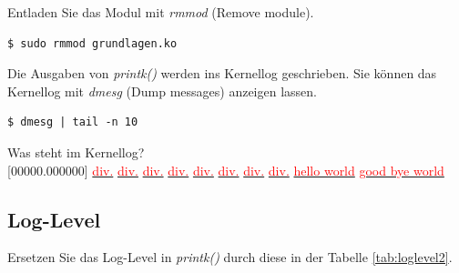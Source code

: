 Entladen Sie das Modul mit \emph{rmmod} (Remove module).
\begin{lstlisting}
$ sudo rmmod grundlagen.ko
\end{lstlisting}

Die Ausgaben von \emph{printk()} werden ins Kernellog geschrieben. Sie können das Kernellog mit \emph{dmesg} (Dump messages) anzeigen lassen.
\begin{lstlisting}
$ dmesg | tail -n 10
\end{lstlisting} \hfill

Was steht im Kernellog? \\

[00000.000000] \underline{\textcolor{red}{div.}\hspace{0.5\textwidth}} \newline
[00000.000000] \underline{\textcolor{red}{div.}\hspace{0.5\textwidth}} \newline
[00000.000000] \underline{\textcolor{red}{div.}\hspace{0.5\textwidth}} \newline
[00000.000000] \underline{\textcolor{red}{div.}\hspace{0.5\textwidth}} \newline
[00000.000000] \underline{\textcolor{red}{div.}\hspace{0.5\textwidth}} \newline
[00000.000000] \underline{\textcolor{red}{div.}\hspace{0.5\textwidth}} \newline
[00000.000000] \underline{\textcolor{red}{div.}\hspace{0.5\textwidth}} \newline
[00000.000000] \underline{\textcolor{red}{div.}\hspace{0.5\textwidth}} \newline
[00000.000000] \underline{\textcolor{red}{hello world}\hspace{0.415\textwidth}} \newline
[00000.000000] \underline{\textcolor{red}{good bye world}\hspace{0.37\textwidth}} \newline

\subsection{Log-Level}

Ersetzen Sie das Log-Level in \emph{printk()} durch diese in der Tabelle \ref{tab:loglevel2}.

